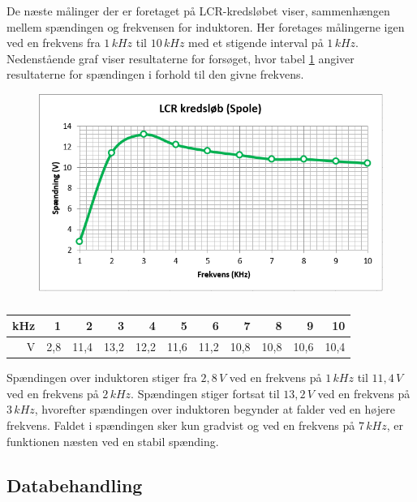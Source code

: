 De næste målinger der er foretaget på LCR-kredsløbet viser, sammenhængen mellem spændingen og frekvensen for induktoren. Her foretages målingerne igen ved en frekvens fra $1\, kHz$ til $10\, kHz$ med et stigende interval på $1\, kHz$. Nedenstående graf viser resultaterne for forsøget, hvor tabel \ref{tabular:lcrspole} angiver resultaterne for spændingen i forhold til den givne frekvens.

\begin{figure}[H]
\includegraphics[scale=1]{Setup/Graf6}
\caption{}
\label{graph:lcrspole}
\end{figure}

\begin{table}[H]
\centering
\begin{tabular}{|r|r|r|r|r|r|r|r|r|r|r|} \hline
kHz & 1 & 2 & 3 & 4 & 5 & 6 & 7 & 8 & 9 & 10 \\ \hline
V & 2,8 & 11,4 & 13,2 & 12,2 & 11,6 & 11,2 & 10,8 & 10,8 & 10,6 & 10,4 \\ \hline
\end{tabular}
\caption{}
\label{tabular:lcrspole}
\end{table}

Spændingen over induktoren stiger fra $2,8\, V$ ved en frekvens på $1\, kHz$ til $11,4\, V$ ved en frekvens på $2\, kHz$. Spændingen stiger fortsat til $13,2\, V$ ved en frekvens på $3\, kHz$, hvorefter spændingen over induktoren begynder at falder ved en højere frekvens. Faldet i spændingen sker kun gradvist og ved en frekvens på $7\, kHz$, er funktionen næsten ved en stabil spænding.

\subsection{Databehandling}

